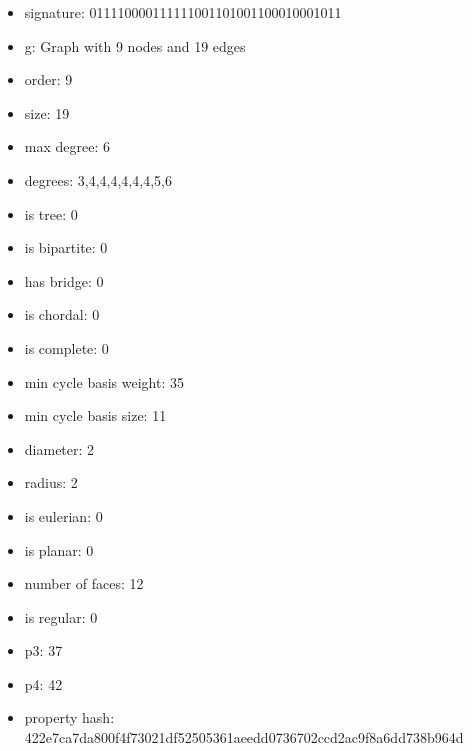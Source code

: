 \newpage
\begin{figure}
\end{figure}
\begin{itemize}
\item signature: 011110000111111001101001100010001011
\item g: Graph with 9 nodes and 19 edges
\item order: 9
\item size: 19
\item max degree: 6
\item degrees: 3,4,4,4,4,4,4,5,6
\item is tree: 0
\item is bipartite: 0
\item has bridge: 0
\item is chordal: 0
\item is complete: 0
\item min cycle basis weight: 35
\item min cycle basis size: 11
\item diameter: 2
\item radius: 2
\item is eulerian: 0
\item is planar: 0
\item number of faces: 12
\item is regular: 0
\item p3: 37
\item p4: 42
\item property hash: 422e7ca7da800f4f73021df52505361aeedd0736702ccd2ac9f8a6dd738b964d
\end{itemize}
